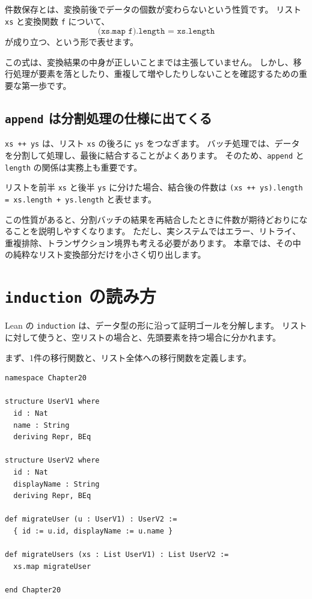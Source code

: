 件数保存とは、変換前後でデータの個数が変わらないという性質です。
リスト \texttt{xs} と変換関数 \texttt{f} について、
\[
  \texttt{(xs.map f).length = xs.length}
\]
が成り立つ、という形で表せます。

この式は、変換結果の中身が正しいことまでは主張していません。
しかし、移行処理が要素を落としたり、重複して増やしたりしないことを確認するための重要な第一歩です。

\subsection{\texttt{append} は分割処理の仕様に出てくる}

\texttt{xs ++ ys} は、リスト \texttt{xs} の後ろに \texttt{ys} をつなぎます。
バッチ処理では、データを分割して処理し、最後に結合することがよくあります。
そのため、\texttt{append} と \texttt{length} の関係は実務上も重要です。

リストを前半 \texttt{xs} と後半 \texttt{ys} に分けた場合、結合後の件数は
\texttt{(xs ++ ys).length = xs.length + ys.length} と表せます。

この性質があると、分割バッチの結果を再結合したときに件数が期待どおりになることを説明しやすくなります。
ただし、実システムではエラー、リトライ、重複排除、トランザクション境界も考える必要があります。
本章では、その中の純粋なリスト変換部分だけを小さく切り出します。

\section{\texttt{induction} の読み方}

Lean の \texttt{induction} は、データ型の形に沿って証明ゴールを分解します。
リストに対して使うと、空リストの場合と、先頭要素を持つ場合に分かれます。

まず、1件の移行関数と、リスト全体への移行関数を定義します。

\begin{listing}[htbp]
\begin{verbatim}
namespace Chapter20

structure UserV1 where
  id : Nat
  name : String
  deriving Repr, BEq

structure UserV2 where
  id : Nat
  displayName : String
  deriving Repr, BEq

def migrateUser (u : UserV1) : UserV2 :=
  { id := u.id, displayName := u.name }

def migrateUsers (xs : List UserV1) : List UserV2 :=
  xs.map migrateUser

end Chapter20
\end{verbatim}
\caption{\texttt{migrateUser} と \texttt{migrateUsers}}
\label{lst:induction-user-migration}
\end{listing}

